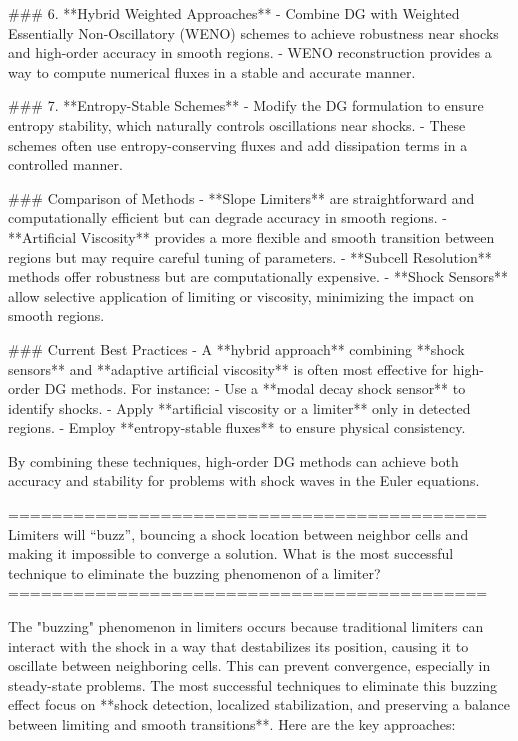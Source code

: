### 6. **Hybrid Weighted Approaches**
   - Combine DG with Weighted Essentially Non-Oscillatory (WENO) schemes to achieve robustness near shocks and high-order accuracy in smooth regions.
   - WENO reconstruction provides a way to compute numerical fluxes in a stable and accurate manner.

### 7. **Entropy-Stable Schemes**
   - Modify the DG formulation to ensure entropy stability, which naturally controls oscillations near shocks.
   - These schemes often use entropy-conserving fluxes and add dissipation terms in a controlled manner.

### Comparison of Methods
- **Slope Limiters** are straightforward and computationally efficient but can degrade accuracy in smooth regions.
- **Artificial Viscosity** provides a more flexible and smooth transition between regions but may require careful tuning of parameters.
- **Subcell Resolution** methods offer robustness but are computationally expensive.
- **Shock Sensors** allow selective application of limiting or viscosity, minimizing the impact on smooth regions.

### Current Best Practices
- A **hybrid approach** combining **shock sensors** and **adaptive artificial viscosity** is often most effective for high-order DG methods. For instance:
  - Use a **modal decay shock sensor** to identify shocks.
  - Apply **artificial viscosity or a limiter** only in detected regions.
  - Employ **entropy-stable fluxes** to ensure physical consistency.

By combining these techniques, high-order DG methods can achieve both accuracy and stability for problems with shock waves in the Euler equations.

============================================
Limiters will “buzz”, bouncing a shock location between neighbor cells and making it impossible to converge a solution. What is the most successful technique to eliminate the buzzing phenomenon of a limiter?
============================================

The "buzzing" phenomenon in limiters occurs because traditional limiters can interact with the shock in a way that destabilizes its position, causing it to oscillate between neighboring cells. This can prevent convergence, especially in steady-state problems. The most successful techniques to eliminate this buzzing effect focus on **shock detection, localized stabilization, and preserving a balance between limiting and smooth transitions**. Here are the key approaches:

